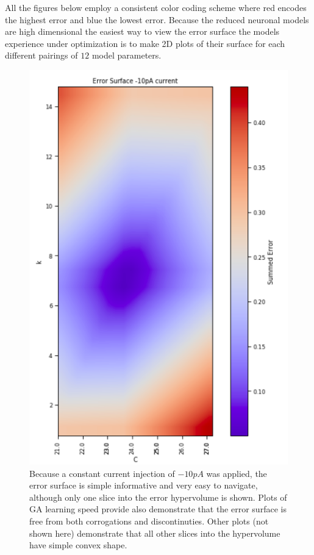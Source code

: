 All the figures below employ a consistent color coding scheme where red encodes the highest error and blue the lowest error. Because the reduced neuronal models are high dimensional the easiest way to view the error surface the models experience under optimization is to make 2D plots of their surface for each different pairings of $12$ model parameters.



\begin{figure}
    \centering
    \includegraphics{figures/friendly_error_surface.png}
    \caption[Using only constant currents causes simple tractible error surfaces]{Because a constant current injection of $-10pA$ was applied, the error surface is simple informative and very easy to navigate, although only one slice into the error hypervolume is shown. Plots of GA learning speed provide also demonstrate that the error surface is free from both corrogations and discontinuties. Other plots (not shown here) demonstrate that all other slices into the hypervolume have simple convex shape.}
    \label{fig:constant_current}
\end{figure}


